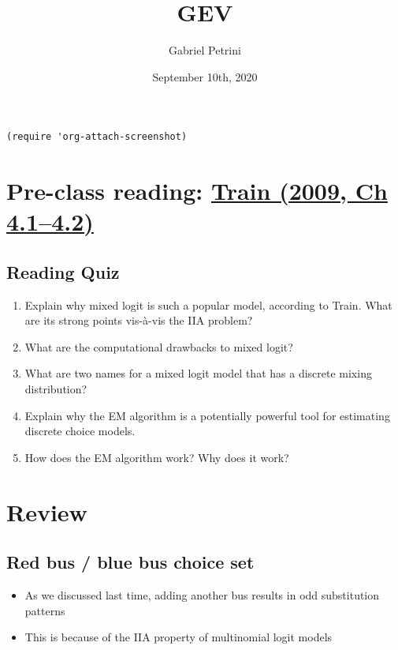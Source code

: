 \documentclass[11pt]{article}
\author{Gabriel Petrini}
\date{September 10th, 2020}
\title{GEV}
\begin{document}
\maketitle
\tableofcontents

\begin{verbatim}
(require 'org-attach-screenshot)
\end{verbatim}

\section{Pre-class reading: \href{http://eml.berkeley.edu/books/choice2nd/Ch04\_p76-96.pdf}{Train (2009, Ch 4.1--4.2)}}
\label{sec:org1985b58}

\subsection{Reading Quiz}
\label{sec:org2fff647}
\begin{enumerate}
\item Explain why mixed logit is such a popular model, according to Train. What are its strong points vis-à-vis the IIA problem?
\item What are the computational drawbacks to mixed logit?
\item What are two names for a mixed logit model that has a discrete mixing distribution?
\item Explain why the EM algorithm is a potentially powerful tool for estimating discrete choice models.
\item How does the EM algorithm work? Why does it work?
\end{enumerate}


\section{Review}
\label{sec:orgb6d108f}

\subsection{Red bus / blue bus choice set}
\label{sec:orgb61cfa8}

\begin{itemize}
\item As we discussed last time, adding another bus results in odd substitution patterns
\item This is because of the IIA property of multinomial logit models
\end{itemize}
\end{document}
